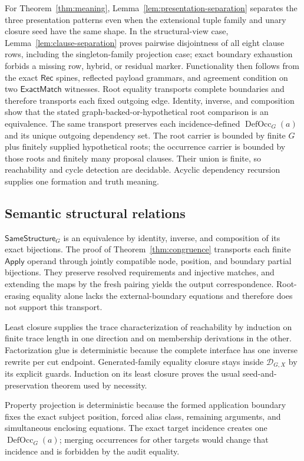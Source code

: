 \documentclass[11pt,twoside]{article}
\newcommand{\Apply}{\mathsf{Apply}}
\newcommand{\SameStructure}{\mathsf{SameStructure}}
\newcommand{\Rec}{\mathsf{Rec}}
\newcommand{\ExactMatch}{\mathsf{ExactMatch}}
\begin{document}
For Theorem~\ref{thm:meaning}, Lemma~\ref{lem:presentation-separation} separates
the three presentation patterns even when the extensional tuple family and unary
closure seed have the same shape.  In the structural-view case,
Lemma~\ref{lem:clause-separation} proves pairwise disjointness of all eight clause
rows, including the singleton-family projection case; exact boundary exhaustion
forbids a missing row, hybrid, or residual marker.  Functionality then follows
from the exact \(\Rec\) spines, reflected payload grammars, and agreement condition
on two \(\ExactMatch\) witnesses.  Root equality transports complete boundaries
and therefore transports each fixed outgoing edge.  Identity, inverse, and
composition show that the stated graph-backed-or-hypothetical root comparison is an
equivalence.  The same transport preserves each incidence-defined
\(\operatorname{DefOcc}_G(a)\) and its unique outgoing dependency set.  The root
carrier is bounded by finite \(G\) plus finitely supplied hypothetical roots; the
occurrence carrier is bounded by those roots and finitely many proposal clauses.
Their union is finite, so reachability and cycle detection are decidable.  Acyclic
dependency recursion supplies one formation and truth meaning.

\subsection{Semantic structural relations}

\(\SameStructure_G\) is an equivalence by identity, inverse, and composition of
its exact bijections.  The proof of Theorem~\ref{thm:congruence} transports each
finite \(\Apply\) operand through jointly compatible node, position, and boundary
partial bijections.  They preserve resolved requirements and injective matches,
and extending the maps by the fresh pairing yields the output correspondence.
Root-erasing equality alone lacks the external-boundary equations and therefore
does not support this transport.

Least closure supplies the trace characterization of reachability by induction on
finite trace length in one direction and on membership derivations in the other.
Factorization glue is deterministic because the complete interface has one inverse
rewrite per cut endpoint.  Generated-family equality closure stays inside
\(\mathcal D_{G,X}\) by its explicit guards.  Induction on its least closure proves
the usual seed-and-preservation theorem used by necessity.

Property projection is deterministic because the formed application boundary
fixes the exact subject position, forced alias class, remaining arguments, and
simultaneous enclosing equations.  The exact target incidence creates one
\(\operatorname{DefOcc}_G(a)\); merging occurrences for other targets would change
that incidence and is forbidden by the audit equality.
\end{document}
